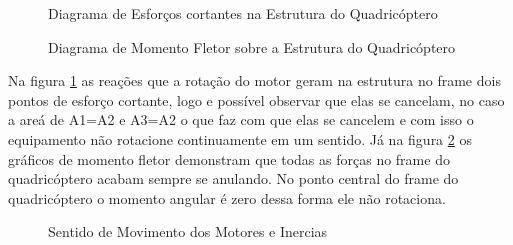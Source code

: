 \begin{figure}[H]
	\centering
	\caption{Diagrama de Esforços cortantes na Estrutura do Quadricóptero}
	\fontsize{9pt}{12pt}\selectfont
	\def\svgwidth{10cm}
	
	\label{fig:esfcort}
\end{figure}


\begin{figure}[H]
	\centering
	\caption{Diagrama de Momento Fletor sobre a Estrutura do Quadricóptero}
	\fontsize{9pt}{12pt}\selectfont
	\def\svgwidth{10cm}
	
	\label{fig:momflet}
\end{figure}

Na figura \ref{fig:esfcort} as reações que a rotação do motor geram na estrutura no frame dois pontos de esforço cortante, logo e possível observar que elas se cancelam, no caso a areá de  A1=A2 e A3=A2 o que faz com que elas se cancelem e com isso o equipamento não rotacione continuamente em um sentido. Já na figura \ref{fig:momflet} os gráficos de momento fletor demonstram que todas as forças no frame do quadricóptero acabam sempre se anulando. No ponto central do frame do quadricóptero o momento angular é zero dessa forma ele não rotaciona\cite{momesf}. 

\begin{figure}[htpb]
	\centering
	\caption{Sentido de Movimento dos Motores e Inercias}
	\fontsize{11pt}{14pt}\selectfont
	\def\svgwidth{13cm}
	
	\label{fig:rotationmot}
\end{figure}

